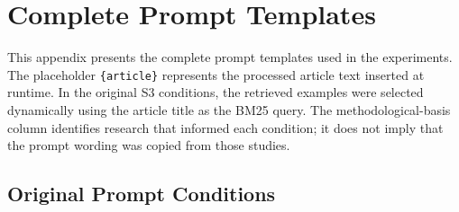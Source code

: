 
\appendix

\chapter{Complete Prompt Templates}
\label{app:prompts}

This appendix presents the complete prompt templates used in the experiments.
The placeholder \texttt{\{article\}} represents the processed article text
inserted at runtime. In the original S3 conditions, the retrieved examples
were selected dynamically using the article title as the BM25 query. The
methodological-basis column identifies research that informed each condition;
it does not imply that the prompt wording was copied from those studies.

\newcommand{\ArticleBlock}{Article: \texttt{\{article\}}\par Summary:}

\newcommand{\FramingDefinitions}{%
Left-leaning framing may include: emphasis on systemic inequality,
pro-government-intervention language, anti-corporate rhetoric, or progressive
social framing.\par
Centre/neutral framing: balanced reporting without clear partisan framing;
presents multiple perspectives or sticks to factual reporting without
editorial slant.\par
Right-leaning framing may include: emphasis on free-market solutions,
anti-regulation language, patriotic or traditional-values framing, or
anti-government-spending rhetoric.}

\newcommand{\NeutralDefinition}{%
Neutral, factual news reporting is characterised by presenting verifiable
facts without editorial judgment, covering multiple perspectives, and
avoiding charged or partisan language.}

\section{Original Prompt Conditions}
\label{app:original-prompts}

\footnotesize
\renewcommand{\arraystretch}{1.25}
\setlength{\tabcolsep}{4pt}

